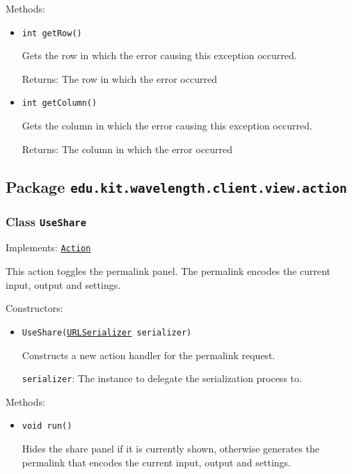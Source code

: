 Methods:
\begin{itemize}
\item \texttt{int getRow()}

Gets the row in which the error causing this exception occurred.

Returns: The row in which the error occurred

\item \texttt{int getColumn()}

Gets the column in which the error causing this exception occurred.

Returns: The column in which the error occurred

\end{itemize}

\subsection{Package \lstinline{edu.kit.wavelength.client.view.action}}
\label{pkg:edu.kit.wavelength.client.view.action}


\subsubsection{Class \texttt{UseShare}}
\label{type:edu.kit.wavelength.client.view.action.UseShare}
Implements: \texttt{\hyperref[type:edu.kit.wavelength.client.view.action.Action]{Action}}

This action toggles the permalink panel. The permalink encodes the current
 input, output and settings.

Constructors:
\begin{itemize}
\item \texttt{UseShare(\hyperref[type:edu.kit.wavelength.client.view.URLSerializer]{URLSerializer} serializer)}

Constructs a new action handler for the permalink request.

\texttt{serializer}: The instance to delegate the serialization process to.

\end{itemize}

Methods:
\begin{itemize}
\item \texttt{void run()}

Hides the share panel if it is currently shown, otherwise generates the
 permalink that encodes the current input, output and settings.

\end{itemize}

